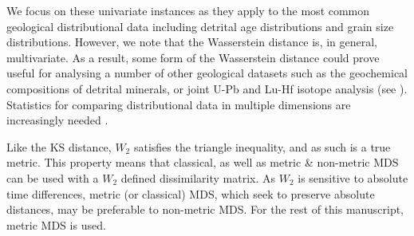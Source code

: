 \documentclass[gchron, manuscript]{copernicus}
\begin{document}
We focus on these univariate instances as they apply to the most common geological distributional data including detrital age distributions and grain size distributions. However, we note that the Wasserstein distance is, in general, multivariate. As a result, some form of the Wasserstein distance could prove useful for analysing a number of other geological datasets such as the geochemical compositions of detrital minerals, or joint U-Pb and Lu-Hf isotope analysis (see \citealt{vermeesch_multidimensional_2023}). Statistics for comparing distributional data in multiple dimensions are increasingly needed \citep{sundell_two-dimensional_2021}. 

Like the KS distance, $W_2$ satisfies the triangle inequality, and as such is a true metric. This property means that classical, as well as metric \& non-metric MDS can be used with a $W_2$ defined dissimilarity matrix. As $W_2$ is sensitive to absolute time differences, metric (or classical) MDS, which seek to preserve absolute distances, may be preferable to non-metric MDS. For the rest of this manuscript, metric MDS is used.  


\end{document}
